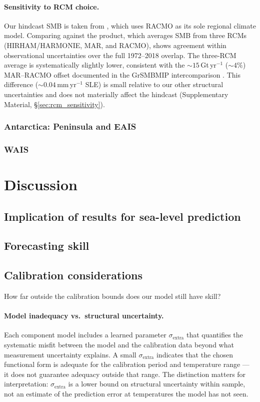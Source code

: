 \documentclass[11pt]{article}
\begin{document}
\paragraph{Sensitivity to RCM choice.}
Our hindcast SMB is taken from \citet{Mouginot2019}, which uses RACMO as its sole regional climate model. Comparing against the \citet{Mankoff2021} product, which averages SMB from three RCMs (HIRHAM/HARMONIE, MAR, and RACMO), shows agreement within observational uncertainties over the full 1972--2018 overlap. The three-RCM average is systematically slightly lower, consistent with the $\sim\!15$\,Gt\,yr$^{-1}$ ($\sim\!4\%$) MAR--RACMO offset documented in the GrSMBMIP intercomparison \citep{Fettweis2020}. This difference ($\sim\!0.04$\,mm\,yr$^{-1}$ SLE) is small relative to our other structural uncertainties and does not materially affect the hindcast (Supplementary Material, \S\ref*{sec:rcm_sensitivity}).

	\subsubsection{Antarctica: Peninsula and EAIS}

	\subsubsection{WAIS}

\section{Discussion}

\subsection{Implication of results for sea-level prediction}

\subsection{Forecasting skill} 

\subsection{Calibration considerations}

How far outside the calibration bounds does our model still have skill?

\paragraph{Model inadequacy vs.\ structural uncertainty.}
Each component model includes a learned parameter $\sigma_{\mathrm{extra}}$ that quantifies the systematic misfit between the model and the calibration data beyond what measurement uncertainty explains. A small $\sigma_{\mathrm{extra}}$ indicates that the chosen functional form is adequate for the calibration period and temperature range --- it does not guarantee adequacy outside that range. The distinction matters for interpretation: $\sigma_{\mathrm{extra}}$ is a lower bound on structural uncertainty within sample, not an estimate of the prediction error at temperatures the model has not seen.
\end{document}
